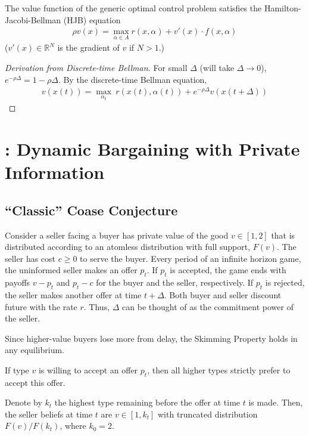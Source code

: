\documentclass[11pt]{elegantbook}
\begin{document}
\begin{proposition}
    The value function of the generic optimal control problem satisfies the Hamilton-Jacobi-Bellman (HJB) equation
    \begin{equation}
        \begin{aligned}
            \rho v(x) = \max_{\alpha\in A} r(x,\alpha) + v'(x)\cdot f(x,\alpha)
        \end{aligned}
        \nonumber
    \end{equation}
    ($v'(x)\in \mathbb{R}^N$ is the gradient of $v$ if $N>1$.)
\end{proposition}
\begin{proof}[Derivation from Discrete-time Bellman]
    For small $\Delta$ (will take $\Delta \rightarrow 0$), $e^{-\rho\Delta}=1-\rho\Delta$. By the discrete-time Bellman equation,
    \begin{equation}
        \begin{aligned}
            v(x(t))=\max_{\alpha_t}\ r(x(t),\alpha(t)) + e^{-\rho\Delta}v(x(t+\Delta))
        \end{aligned}
        \nonumber
    \end{equation}
\end{proof}



\chapter{\cite{fuchs2022dynamic}: Dynamic Bargaining with Private Information}

\section{``Classic'' Coase Conjecture}
Consider a seller facing a buyer has private value of the good $v\in[1,2]$ that is distributed according to an atomless distribution with full support, $F(v)$. The seller has cost $c\geq 0$ to serve the buyer. Every period of an infinite horizon game, the uninformed seller makes an offer $p_t$. If $p_t$ is accepted, the game ends with payoffs $v-p_t$ and $p_t-c$ for the buyer and the seller, respectively. If $p_t$ is rejected, the seller makes another offer at time $t+\Delta$. Both buyer and seller discount future with the rate $r$. Thus, $\Delta$ can be thought of as the commitment power of the seller.

Since higher-value buyers lose more from delay, the Skimming Property holds in any equilibrium.
\begin{lemma}
    If type $v$ is willing to accept an offer $p_t$, then all higher types strictly prefer to accept this offer.
\end{lemma}
Denote by $k_t$ the highest type remaining before the offer at time $t$ is made. Then, the seller beliefs at time $t$ are $v\in[1,k_t]$ with truncated distribution $F(v)/F(k_t)$, where $k_0=2$.
\end{document}
